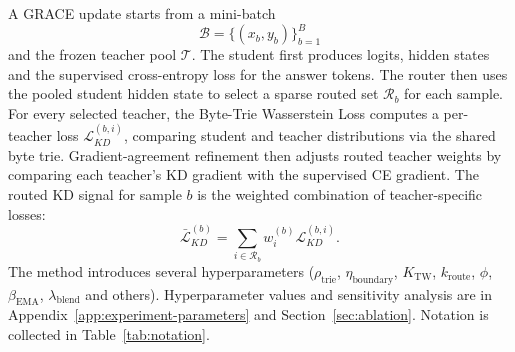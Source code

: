 A GRACE update starts from a mini-batch
\[
\mathcal{B}=\{(x_b,y_b)\}_{b=1}^{B}
\]
and the frozen teacher pool \(\mathcal{T}\). The student first
produces logits, hidden states and the supervised cross-entropy loss for the answer tokens. The
router then uses the pooled student hidden state to select a sparse routed set
\(\mathcal{R}_b\) for each sample. For every selected teacher, the Byte-Trie Wasserstein Loss computes a
per-teacher loss \(\mathcal{L}_{KD}^{(b,i)}\), comparing student and teacher
distributions via the shared byte trie.
Gradient-agreement refinement then adjusts routed teacher weights by
comparing each teacher's KD gradient with the supervised CE gradient. The routed KD signal for sample \(b\)
is the weighted combination of teacher-specific losses:
\[
\bar{\mathcal{L}}_{KD}^{(b)}
=
\sum_{i\in\mathcal{R}_b}
w_i^{(b)}\mathcal{L}_{KD}^{(b,i)}.
\]
The method introduces several hyperparameters
(\(\rho_{\mathrm{trie}}\), \(\eta_{\mathrm{boundary}}\), \(K_{\mathrm{TW}}\),
\(k_{\mathrm{route}}\), \(\phi\), \(\beta_{\mathrm{EMA}}\), \(\lambda_{\mathrm{blend}}\)
and others). Hyperparameter values and sensitivity analysis are in
Appendix~\ref{app:experiment-parameters} and Section~\ref{sec:ablation}.
Notation is collected in Table~\ref{tab:notation}.

